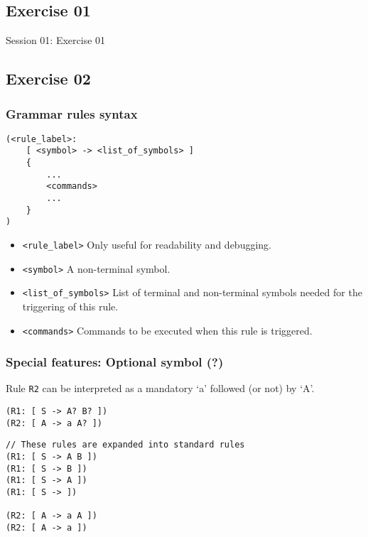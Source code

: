 \documentclass[11pt]{beamer}
\begin{document}
\subsection{Exercise 01}

\begin{frame}[fragile]
\Huge
\begin{center}
Session 01: Exercise 01
\end{center}
\end{frame}

\subsection{Exercise 02}

\begin{frame}[fragile]
\frametitle{Grammar rules syntax}
\begin{lstlisting}[language=lekta]
(<rule_label>:
	[ <symbol> -> <list_of_symbols> ]
	{
		...
		<commands>
		...
	}
)
\end{lstlisting}
\pause
\begin{itemize}
	\item \texttt{<rule\_label>} Only useful for readability and debugging.
	\item \texttt{<symbol>} A non-terminal symbol.
	\item \texttt{<list\_of\_symbols>} List of terminal and non-terminal symbols needed for the triggering of this rule.
	\item \texttt{<commands>} Commands to be executed  when this rule is triggered.
\end{itemize}
\end{frame}

\begin{frame}[fragile]
\frametitle{Special features: Optional symbol (?)}
\small
Rule \texttt{R2} can be interpreted as a mandatory `a' followed (or not) by `A'.
\begin{lstlisting}[language=lekta]
(R1: [ S -> A? B? ])
(R2: [ A -> a A? ])
\end{lstlisting}
\pause
\begin{lstlisting}[language=lekta]
// These rules are expanded into standard rules
(R1: [ S -> A B ])
(R1: [ S -> B ])
(R1: [ S -> A ])
(R1: [ S -> ])

(R2: [ A -> a A ])
(R2: [ A -> a ])
\end{lstlisting}
\end{frame}
\end{document}
